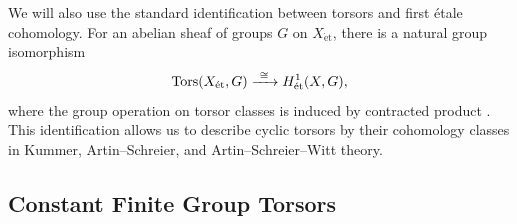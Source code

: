 



We will also use the standard identification between torsors and first
\'etale cohomology. For an abelian sheaf of groups $G$ on
$X_{\mathrm{\acute et}}$, there is a natural group isomorphism
\[
\Tors(X_{\mathrm{\acute et}},G)\xrightarrow{\ \cong\ }
H^1_{\mathrm{\acute et}}(X,G),
\]
where the group operation on torsor classes is induced by contracted
product \cite[III, \S4, Proposition~4.6 and Remark~4.8(b)]{milneEC}. This identification allows us to describe
cyclic torsors by their cohomology classes in Kummer, Artin--Schreier, and
Artin--Schreier--Witt theory.




\subsection*{Constant Finite Group Torsors}

